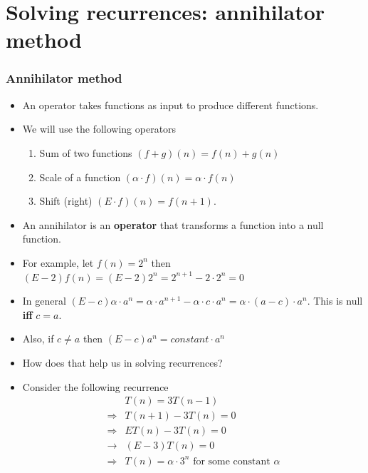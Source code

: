 \documentclass{beamer}
\begin{document}
\section{Solving recurrences: annihilator method}
\begin{frame}
  \frametitle{Annihilator method}
  \begin{itemize}
  \item An operator takes functions as input to produce different functions.
  \item We will use the following operators
    \begin{enumerate}
    \item Sum of two functions $(f+g)(n)=f(n)+g(n)$
    \item Scale of a function $(\alpha\cdot f)(n)=\alpha\cdot f(n)$
   \item Shift (right) $(E\cdot f)(n)=f(n+1)$.
    \end{enumerate}
  \item An annihilator is an \textbf{operator}  that transforms a function into a null function.
  \item For example, let $f(n)=2^n$ then $(E-2)f(n)=(E-2)2^n=2^{n+1}-2\cdot 2^n=0$ 
  \end{itemize}
\end{frame}
\begin{frame}
  \begin{itemize}
  \item In general $(E-c)\alpha\cdot a^n=\alpha\cdot a^{n+1}-\alpha\cdot c\cdot a^n=\alpha\cdot (a-c)\cdot a^n$. This is null \textbf{iff} $c=a$.
  \item Also, if $c\neq a$ then $(E-c)a^n=constant\cdot a^n$
  \item How does that help us in solving recurrences?
  \item Consider the following recurrence
    \begin{align*}
      &T(n)=3T(n-1)\\
   \Rightarrow &T(n+1)-3T(n)=0\\
   \Rightarrow &ET(n)-3T(n)=0\\
   \rightarrow &(E-3)T(n)=0\\
   \Rightarrow & T(n)=\alpha\cdot 3^n \text{ for some constant }\alpha
 \end{align*}
  \end{itemize}
\end{frame}
\end{document}
